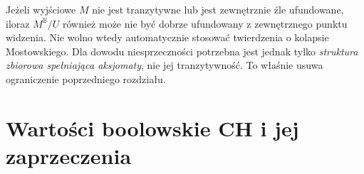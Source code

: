 \begin{uwaga}
\label{rem:boolean35-ill-founded}
Jeżeli wyjściowe $M$ nie jest
tranzytywne lub jest zewnętrznie
źle ufundowane, iloraz
$M^{\mathbb B}/U$ również może
nie być dobrze ufundowany
z zewnętrznego punktu widzenia.
Nie wolno wtedy automatycznie
stosować twierdzenia o kolapsie
Mostowskiego. Dla dowodu
niesprzeczności potrzebna jest
jednak tylko \emph{struktura
zbiorowa spełniająca aksjomaty},
nie jej tranzytywność.
To właśnie usuwa ograniczenie
poprzedniego rozdziału.
\end{uwaga}

\section{Wartości boolowskie CH i jej zaprzeczenia}

